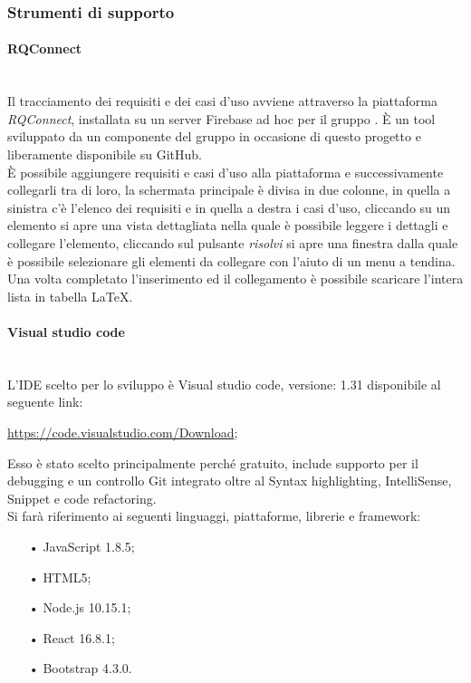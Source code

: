 \subsubsection{Strumenti di supporto}
\paragraph{RQConnect}\mbox{}\\ \label{sec:Trac}
Il tracciamento dei requisiti e dei casi d’uso avviene attraverso la piattaforma 
\textit{RQConnect}, installata su un server {Firebase} ad hoc per il gruppo \gruppo.
 È  un tool sviluppato da un componente del gruppo in occasione di questo progetto e 
 liberamente disponibile su GitHub.\\ È possibile aggiungere requisiti e casi d’uso 
 alla piattaforma e successivamente collegarli tra di loro, la schermata principale è 
 divisa in due colonne, in quella a sinistra c’è l’elenco dei requisiti e in quella a 
 destra i casi d’uso, cliccando su un elemento si apre una vista dettagliata nella quale 
 è possibile leggere i dettagli e collegare l’elemento, cliccando sul pulsante \textit{risolvi} si 
 apre una finestra dalla quale è possibile selezionare gli elementi da collegare con l’aiuto 
 di un menu a tendina.\\Una volta completato l’inserimento ed il collegamento è possibile scaricare 
 l’intera lista in tabella \LaTeX.

\paragraph{Visual studio code}\mbox{}\\
L'{IDE} scelto per lo sviluppo è {Visual studio code}, versione: 1.31 disponibile al seguente link:
\begin{center}
	\url{https://code.visualstudio.com/Download};
\end{center}
Esso è stato scelto principalmente perché gratuito, include supporto per il debugging e un controllo Git integrato oltre al {Syntax highlighting}, {IntelliSense}, {Snippet} e {code refactoring}.\\
Si farà riferimento ai seguenti linguaggi, piattaforme, librerie e framework:
\begin{itemize}
	\item[•]{JavaScript} 1.8.5;
	\item[•]{HTML5};
	\item[•]{Node.js} 10.15.1;
	\item[•]{React} 16.8.1;
	\item[•]{Bootstrap} 4.3.0.
\end{itemize}

